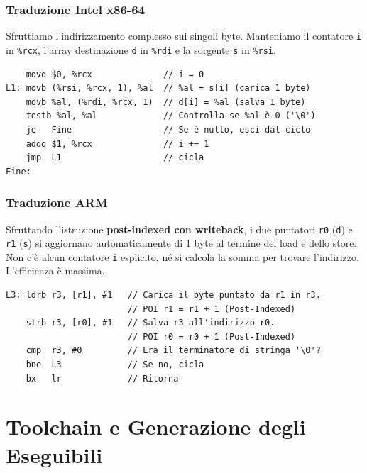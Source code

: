 \documentclass[12pt, a4paper]{article}
\begin{document}
\subsubsection{Traduzione Intel x86-64}
Sfruttiamo l'indirizzamento complesso sui singoli byte. Manteniamo il contatore \texttt{i} in \texttt{\%rcx}, l'array destinazione \texttt{d} in \texttt{\%rdi} e la sorgente \texttt{s} in \texttt{\%rsi}.
\begin{verbatim}
    movq $0, %rcx              // i = 0
L1: movb (%rsi, %rcx, 1), %al  // %al = s[i] (carica 1 byte)
    movb %al, (%rdi, %rcx, 1)  // d[i] = %al (salva 1 byte)
    testb %al, %al             // Controlla se %al è 0 ('\0')
    je   Fine                  // Se è nullo, esci dal ciclo
    addq $1, %rcx              // i += 1
    jmp  L1                    // cicla
Fine:
\end{verbatim}

\subsubsection{Traduzione ARM}
Sfruttando l'istruzione \textbf{post-indexed con writeback}, i due puntatori \texttt{r0} (\texttt{d}) e \texttt{r1} (\texttt{s}) si aggiornano automaticamente di 1 byte al termine del load e dello store. Non c'è alcun contatore \texttt{i} esplicito, né si calcola la somma per trovare l'indirizzo. L'efficienza è massima.
\begin{verbatim}
L3: ldrb r3, [r1], #1   // Carica il byte puntato da r1 in r3. 
                        // POI r1 = r1 + 1 (Post-Indexed)
    strb r3, [r0], #1   // Salva r3 all'indirizzo r0. 
                        // POI r0 = r0 + 1 (Post-Indexed)
    cmp  r3, #0         // Era il terminatore di stringa '\0'?
    bne  L3             // Se no, cicla
    bx   lr             // Ritorna
\end{verbatim}


\section{Toolchain e Generazione degli Eseguibili}
\end{document}
